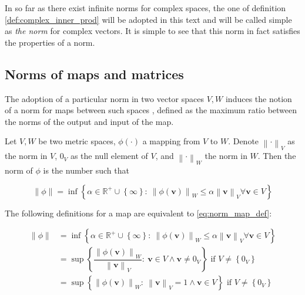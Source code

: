 	In so far as there exist infinite norms for complex spaces, the one of definition \ref{def:complex_inner_prod} will be adopted in this text and will be called simple as \textit{the norm} for complex vectors. It is simple to see that this norm in fact satisfies the properties of a norm.

\subsection{Norms of maps and matrices}

	The adoption of a particular norm in two vector spaces $V,W$ induces the notion of a norm for maps between such spaces , defined as the maximum ratio between the norms of the output and input of the map.

\begin{definition} \label{def:mapping_norm}
	Let $V,W$ be two metric spaces, $\phi\left(\cdot\right)$ a mapping from $V$ to $W$. Denote $\left\lVert \cdot\right\rVert_V$ as the norm in $V$, $0_V$ as the null element of $V$, and $\left\lVert \cdot\right\rVert_W$ the norm in $W$. Then the norm of $\phi$ is the number such that

\begin{equation} \left\lVert \phi \right\rVert  = \inf\left\{ \alpha\in\mathbb{R}^+\cup\left\{\infty\right\}:\ \left\lVert \phi\left(\mathbf{v}\right)\right\rVert_W \leq \alpha\left\lVert \mathbf{v}\right\rVert_V \forall \mathbf{v}\in V\right\} \label{eq:norm_map_def}\end{equation}
\end{definition}
\begin{definitionremark}\label{remark:equiv_def_map}
	The following definitions for a map are equivalent to \eqref{eq:norm_map_def}:

\begin{align}
	\left\lVert \phi \right\rVert &= \inf\left\{ \alpha\in\mathbb{R}^+\cup\left\{\infty\right\}:\ \left\lVert \phi\left(\mathbf{v}\right)\right\rVert_W \leq \alpha\left\lVert \mathbf{v}\right\rVert_V \forall \mathbf{v}\in V\right\} \label{eq:norm_map_def_1} \\[3mm]
	&= \sup\left\{ \dfrac{\left\lVert \phi\left(\mathbf{v}\right)\right\rVert_W}{\left\lVert \mathbf{v}\right\rVert_V}:\ \mathbf{v}\in V\wedge \mathbf{v}\neq 0_V \right\} \text{ if } V\neq\left\{0_V\right\} \label{eq:norm_map_def_2}\\[3mm]
	&= \sup\left\{ \left\lVert \phi\left(\mathbf{v}\right)\right\rVert_W:\ \left\lVert \mathbf{v}\right\rVert_V = 1 \wedge \mathbf{v}\in V \right\} \text{ if } V\neq\left\{0_V\right\} \label{eq:norm_map_def_3}
\end{align}
\end{definitionremark}

